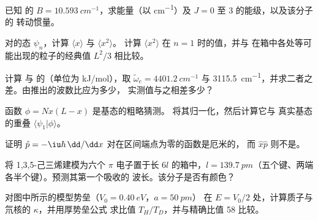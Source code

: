 \begin{exercise}[$\star$]\label{exo:b3:quantum-model-systems:4}
已知  的 $B = \qty{10.593}{cm^{-1}}$，求能量（以
\unit{cm^{-1}}）及 $J = 0$ 至 3 的能级，以及该分子的
转动惯量。
\end{exercise}

\begin{exercise}[$\star\star$]\label{exo:b3:quantum-model-systems:5}
对的态 $\psi_n$，计算 $\langle x\rangle$ 与 $\langle x^2\rangle$。
计算 $\langle x^2\rangle$ 在 $n = 1$ 时的值，并与
在箱中各处等可能出现的粒子的经典值 $L^2/3$ 相比较。
\end{exercise}

\begin{exercise}[$\star\star$]\label{exo:b3:quantum-model-systems:6}
计算  与  的（单位为
\unit{kJ/mol}），取 $\tilde\omega_e = \qty{4401.2}{cm^{-1}}$ 与
\qty{3115.5}{cm^{-1}}，并求二者之差。由推出的波数比应为多少，
实测值与之相差多少？
\end{exercise}

\begin{exercise}[$\star\star$]\label{exo:b3:quantum-model-systems:7}
函数 $\phi = Nx(L - x)$ 是基态的粗略猜测。
将其归一化，然后计算它与
真实基态的重叠 $\langle\psi_1|\phi\rangle$。
\end{exercise}

\begin{exercise}[$\star\star$]\label{exo:b3:quantum-model-systems:8}
证明 $\hat p = -\iu\hbar\,\dd/\dd x$ 对在区间端点为零的函数是厄米的，
而 $\hat x\hat p$ 则不是。
\end{exercise}

\begin{exercise}[$\star\star$]\label{exo:b3:quantum-model-systems:9}
将 1,3,5-己三烯建模为六个 $\pi$ 电子置于长 $6l$ 的箱中，$l =
\qty{139.7}{pm}$（五个键、两端各半个键）。预测其第一个吸收的
波长。该分子是否有颜色？
\end{exercise}

\begin{exercise}[$\star\star\star$]\label{exo:b3:quantum-model-systems:10}
对图中所示的模型势垒（$V_0 = \qty{0.40}{eV}$，$a = \qty{50}{pm}$）
在 $E = V_0/2$ 处，计算质子与氘核的 $\kappa$，并用厚势垒公式
求比值 $T_H/T_D$，并与精确比值 58 比较。
\end{exercise}

